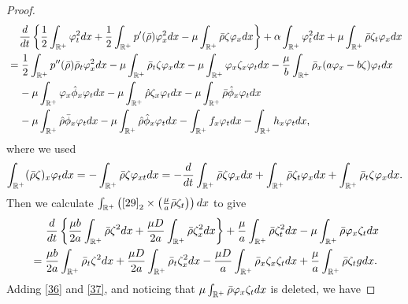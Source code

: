 \documentclass[10pt,a4paper]{amsart}
\begin{document}
\begin{proof}
		\begin{align}\label{36}
			&\;\;\;\;	\frac{{\rm d}}{{\rm d}t}\left\{\frac{1}{2}\int_{\mathbb{R}^+}\varphi_t^2{\rm d}x+\frac{1}{2}\int_{\mathbb{R}^+}p^{\prime}(\bar\rho)\varphi_x^2{\rm d}x-\mu\int_{\mathbb{R}^+}\bar\rho\zeta\varphi_x{\rm d}x\right\}+\alpha\int_{\mathbb{R}^+}\varphi_t^2{\rm d}x+\mu\int_{\mathbb{R}^+}\bar\rho\zeta_t\varphi_x{\rm d}x\notag\\
			&=\frac{1}{2}\int_{\mathbb{R}^+}p^{\prime\prime}(\bar\rho)\bar\rho_t\varphi_x^2{\rm d}x-\mu\int_{\mathbb{R}^+}\bar\rho_t\zeta\varphi_x{\rm d}x-\mu\int_{\mathbb{R}^+}\varphi_x\zeta_x\varphi_t{\rm d}x-\frac{\mu}{b}\int_{\mathbb{R}^+}\bar\rho_x(a\varphi_x-b\zeta)\varphi_t{\rm d}x\notag\\
			&\;\;\;\;-\mu\int_{\mathbb{R}^+}\varphi_x\hat\phi_x\varphi_t{\rm d}x-\mu\int_{\mathbb{R}^+}\hat\rho\zeta_x\varphi_t{\rm d}x-\mu\int_{\mathbb{R}^+}\bar\rho\hat\phi_x\varphi_t{\rm d}x\notag\\
			&\;\;\;\;-\mu\int_{\mathbb{R}^+}\hat\rho\bar\phi_x\varphi_t{\rm d}x-\mu\int_{\mathbb{R}^+}\hat\rho\hat\phi_x\varphi_t{\rm d}x-\int_{\mathbb{R}^+}f_x\varphi_t{\rm d}x-\int_{\mathbb{R}^+}h_x\varphi_t{\rm d}x,
		\end{align}
		where we used 
		\begin{align}\notag
		\int_{\mathbb{R}^+}(\bar\rho\zeta)_x\varphi_t{\rm d}x=-\int_{\mathbb{R}^+}\bar\rho\zeta\varphi_{xt}{\rm d}x=-\frac{{\rm d}}{{\rm d}t}\int_{\mathbb{R}^+}\bar\rho\zeta\varphi_{x}{\rm d}x+\int_{\mathbb{R}^+}\bar\rho\zeta_t\varphi_x{\rm d}x+\int_{\mathbb{R}^+}\bar\rho_t\zeta\varphi_x{\rm d}x.	
		\end{align}
		Then we calculate
		$\int_{\mathbb{R}^+}\left(\eqref{29}_2\times\left(\frac{\mu}{a}\bar\rho\zeta_t\right)\right){\rm d}x$ to give
		\begin{align}\label{37}
			&\;\;\;\;\;	\frac{{\rm d}}{{\rm d}t}\left\{\frac{\mu b}{2a}\int_{\mathbb{R}^+}^{}\bar\rho\zeta^2{\rm d}x+\frac{\mu D}{2a}\int_{\mathbb{R}^+}^{}\bar\rho\zeta_x^2{\rm d}x\right\}
			+\frac{\mu}{a}\int_{\mathbb{R}^+}^{}\bar\rho\zeta_t^2{\rm d}x-\mu\int_{\mathbb{R}^+}^{}\bar\rho\varphi_x\zeta_t {\rm d}x\notag\\
			&=\frac{\mu b}{2a}\int_{\mathbb{R}^+}^{}\bar\rho_t\zeta^2{\rm d}x+\frac{\mu D}{2a}\int_{\mathbb{R}^+}^{}\bar\rho_t\zeta_x^2{\rm d}x
			-\frac{\mu D}{a}\int_{\mathbb{R}^+}^{}\bar\rho_x\zeta_x\zeta_t {\rm d}x+\frac{\mu}{a}\int_{\mathbb{R}^+}^{}\bar\rho\zeta_tg {\rm d}x.
		\end{align}
		Adding \eqref{36} and \eqref{37}, and noticing that $\mu\int_{\mathbb{R}^+}^{}\bar\rho\varphi_x\zeta_t {\rm d}x$ is deleted, we have

\end{proof}
\end{document}
